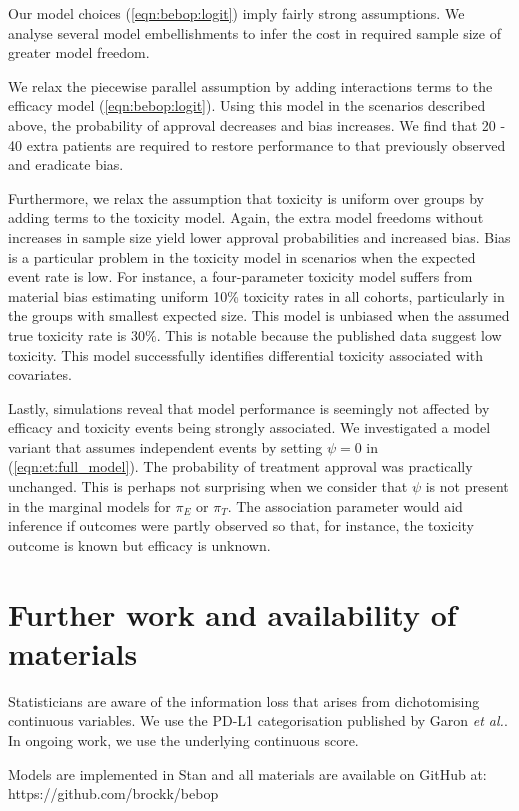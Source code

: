 \documentclass[graybox]{svmult}
\begin{document}
Our model choices (\ref{eqn:bebop:logit}) imply fairly strong assumptions.
We analyse several model embellishments to infer the cost in required sample size of greater model freedom.

We relax the piecewise parallel assumption by adding interactions terms to the efficacy model (\ref{eqn:bebop:logit}).
Using this model in the scenarios described above, the probability of approval decreases and bias increases.
We find that 20 - 40 extra patients are required to restore performance to that previously observed and eradicate bias.

Furthermore, we relax the assumption that toxicity is uniform over groups by adding terms to the toxicity model.
Again, the extra model freedoms without increases in sample size yield lower approval probabilities and increased bias.
Bias is a particular problem in the toxicity model in scenarios when the expected event rate is low.
For instance, a four-parameter toxicity model suffers from material bias estimating uniform 10\% toxicity rates in all cohorts, particularly in the groups with smallest expected size.
This model is unbiased when the assumed true toxicity rate is 30\%.
This is notable because the published data\cite{Garon2015, Herbst2016} suggest low toxicity.
This model successfully identifies differential toxicity associated with covariates.

Lastly, simulations reveal that model performance is seemingly not affected by efficacy and toxicity events being strongly associated. 
We investigated a model variant that assumes independent events by setting $\psi = 0$ in (\ref{eqn:et:full_model}).
The probability of treatment approval was practically unchanged.
This is perhaps not surprising when we consider that $\psi$ is not present in the marginal models for $\pi_E$ or $\pi_T$.
The association parameter would aid inference if outcomes were partly observed so that, for instance, the toxicity outcome is known but efficacy is unknown.


\section{Further work and availability of materials}
Statisticians are aware of the information loss that arises from dichotomising continuous variables.
We use the PD-L1 categorisation published by Garon \textit{et al.}\cite{Garon2015}.
In ongoing work, we use the underlying continuous score. 

Models are implemented in Stan\cite{Carpenter2016} and all materials are available on GitHub at:\\
https://github.com/brockk/bebop

\newpage
%
\printbibliography[heading=bibintoc]
\end{document}
